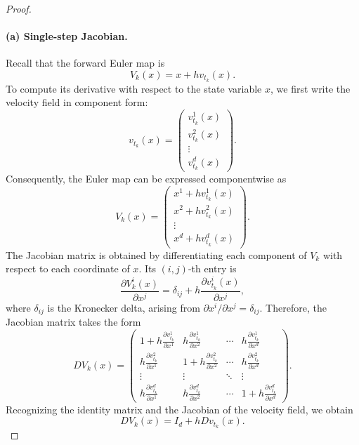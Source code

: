 \documentclass[12pt,a4paper,oneside]{book}
\begin{document}
\begin{proof}

\paragraph{(a) Single-step Jacobian.}
Recall that the forward Euler map is
\begin{equation*}
    V_k(x)=x+h v_{t_k}(x).
\end{equation*}
To compute its derivative with respect to the state variable $x$, we first write the velocity field in component form:
\begin{equation*}
    v_{t_k}(x)=
        \begin{pmatrix}
            v_{t_k}^{1}(x)\\
            v_{t_k}^{2}(x)\\
            \vdots\\
            v_{t_k}^{d}(x)
        \end{pmatrix}.
\end{equation*}
Consequently, the Euler map can be expressed componentwise as
\begin{equation*}
    V_k(x) =
    \begin{pmatrix}
        x^1+h v_{t_k}^{1}(x)\\
        x^2+h v_{t_k}^{2}(x)\\
        \vdots\\
        x^d+h v_{t_k}^{d}(x)
    \end{pmatrix}.
\end{equation*}
The Jacobian matrix is obtained by differentiating each component of $V_k$ with respect to each coordinate of $x$. Its
$(i,j)$-th entry is
\begin{equation*}
    \frac{\partial V_k^i(x)}{\partial x^j} = \delta_{ij} + h\frac{\partial v_{t_k}^{i}(x)}{\partial x^j},
\end{equation*}
where $\delta_{ij}$ is the Kronecker delta, arising from $\partial x^i/\partial x^j=\delta_{ij}$. Therefore, the Jacobian
matrix takes the form
\begin{equation*}
    DV_k(x)=
    \begin{pmatrix}
        1+h\frac{\partial v_{t_k}^{1}}{\partial x^1}
        & h\frac{\partial v_{t_k}^{1}}{\partial x^2}
        & \cdots
        & h\frac{\partial v_{t_k}^{1}}{\partial x^d}
        \\
        h\frac{\partial v_{t_k}^{2}}{\partial x^1}
        & 1+h\frac{\partial v_{t_k}^{2}}{\partial x^2}
        & \cdots
        & h\frac{\partial v_{t_k}^{2}}{\partial x^d}
        \\
        \vdots & \vdots & \ddots & \vdots
        \\
        h\frac{\partial v_{t_k}^{d}}{\partial x^1}
        & h\frac{\partial v_{t_k}^{d}}{\partial x^2}
        & \cdots
        & 1+h\frac{\partial v_{t_k}^{d}}{\partial x^d}
    \end{pmatrix}.
\end{equation*}
Recognizing the identity matrix and the Jacobian of the velocity field, we obtain
\begin{equation*}
    DV_k(x)=I_d+hDv_{t_k}(x).
\end{equation*}


\end{proof}
\end{document}
